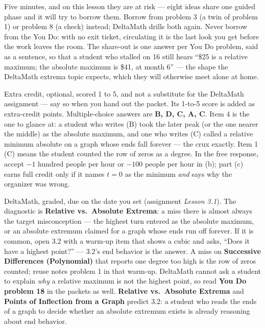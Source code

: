 \documentclass[10pt]{article}
\begin{document}
\begin{teachernote}[Debrief]
Five minutes, and on this lesson they are at risk --- eight ideas share one guided phase and it
will try to borrow them. Borrow from problem 3 (a twin of problem 1) or problem 8 (a check)
instead; DeltaMath drills both again. Never borrow from the You Do: with no exit ticket,
circulating it is the last look you get before the work leaves the room. The share-out is one
answer per You Do problem, said as a sentence, so that a student who stalled on 16 still hears
``\$25 is a relative maximum; the absolute maximum is \$41, at month 6'' --- the shape the
DeltaMath extrema topic expects, which they will otherwise meet alone at home.
\end{teachernote}

\begin{teachernote}[AP Practice]
Extra credit, optional, scored 1 to 5, and not a substitute for the DeltaMath assignment --- say
so when you hand out the packet. Its 1-to-5 score is added as extra-credit points.
Multiple-choice answers are \textbf{B, D, C, A, C}. Item 4 is the one to glance at: a student who
writes (B) took the later peak (or the one nearer the middle) as the absolute maximum, and one who
writes (C) called a relative minimum absolute on a graph whose ends fall forever --- the crux
exactly. Item 1 (C) means the student counted the row of zeros as a degree. In the free response,
accept $-1$ hundred people per hour or $-100$ people per hour in (b); part (c) earns full credit
only if it names $t = 0$ as the minimum \emph{and} says why the organizer was wrong.
\end{teachernote}

\begin{teachernote}[Homework]
DeltaMath, graded, due on the date you set (assignment \textit{Lesson 3.1}). The diagnostic is
\textbf{Relative vs.\ Absolute Extrema}: a miss there is almost always the target misconception
--- the highest turn entered as the absolute maximum, or an absolute extremum claimed for a graph
whose ends run off forever. If it is common, open 3.2 with a warm-up item that shows a cubic and
asks, ``Does it have a highest point?'' --- 3.2's end behavior is the answer. A miss on
\textbf{Successive Differences (Polynomial)} that reports one degree too high is the row of zeros
counted; reuse notes problem 1 in that warm-up. DeltaMath cannot ask a student to explain
\emph{why} a relative maximum is not the highest point, so read \textbf{You Do problem 18} in the
packets as well. \textbf{Relative vs.\ Absolute Extrema} and \textbf{Points of Inflection from a
Graph} predict 3.2: a student who reads the ends of a graph to decide whether an absolute
extremum exists is already reasoning about end behavior.
\end{teachernote}
\end{document}
